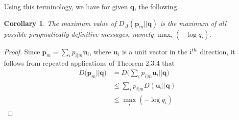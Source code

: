 \documentclass[11pt]{article}
\newtheorem*{corollary}{Corollary}
\begin{document}
Using this terminology, we have  for given  $\mathbf q$, the following
\begin{corollary}
The maximum value of $D_\Delta(\mathbf p_m || \mathbf q)$ is the maximum of all possible pragmatically definitive messages, 
namely $\max_i (-\log q_i)$.
\end{corollary}
\begin{proof}
Since $\mathbf p_m = \sum_i p_{i|m} \mathbf u_i$, where $\mathbf u_i$ is a unit vector in the ${\rm i}^{th}$ direction, it follows from repeated applications of Theorem 2.3.4 that 
\begin{align*}
D\Big(\mathbf p_m || \mathbf q\Big)          &=  D\Big(\sum_i p_{i|m} \mathbf u_i || \mathbf q\Big)                        \\
                                                              &\leq \sum_i p_{i|m} D\left(\mathbf u_i || \mathbf q \right)                   \\
                                                              &\leq \max_i \left(-\log q_i \right)
\end{align*}

\end{proof}
\end{document}
